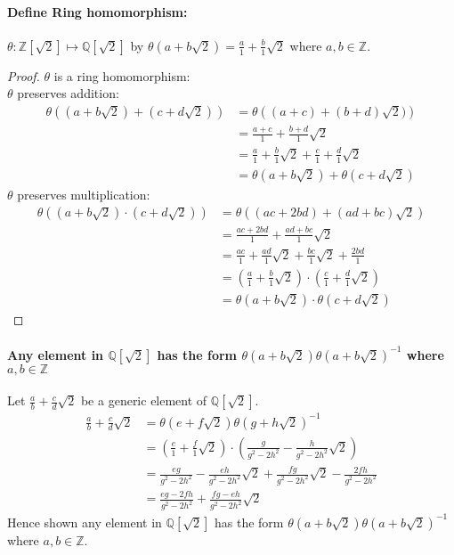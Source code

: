 \documentclass[12pt]{article}
\begin{document}
\begin{enumerate}
\begin{enumerate}
			\paragraph{Define Ring homomorphism:} $\theta: \mathbb{Z}[\sqrt{2}]
			\mapsto \mathbb{Q}[\sqrt{2}]$ by $\theta (a+b\sqrt{2}) =
			\frac{a}{1}+\frac{b}{1}\sqrt{2}$ where $a,b \in \mathbb{Z}$.
			\begin{proof} $\theta$ is a ring homomorphism:\\
				$\theta$ preserves addition:
				\begin{align*}
					\theta \left((a+b\sqrt{2}) + (c+d\sqrt{2})\right) &= \theta
						\left((a+c) + (b+d)\sqrt{2})\right)\\
					&= \frac{a+c}{1} + \frac{b+d}{1}\sqrt{2}\\
					&= \frac{a}{1} + \frac{b}{1}\sqrt{2} + \frac{c}{1} +
						\frac{d}{1}\sqrt{2}\\
					&= \theta (a+b\sqrt{2}) + \theta(c+d\sqrt{2})
				\end{align*}
				$\theta$ preserves multiplication:
				\begin{align*}
					\theta \left((a+b\sqrt{2}) \cdot (c+d\sqrt{2})\right) &= \theta
					((ac+2bd) + (ad + bc)\sqrt{2})\\
					&= \frac{ac+2bd}{1} + \frac{ad + bc}{1}\sqrt{2} \\
					&= \frac{ac}{1} + \frac{ad}{1}\sqrt{2} + \frac{bc}{1}\sqrt{2} +
						\frac{2bd}{1}\\
					&= (\frac{a}{1} + \frac{b}{1}\sqrt{2}) \cdot (\frac{c}{1} +
						\frac{d}{1}\sqrt{2})\\
					&= \theta (a+b\sqrt{2}) \cdot \theta(c+d\sqrt{2})
				\end{align*}
			\end{proof}
			\paragraph{Any element in $\mathbb{Q}[\sqrt{2}]$ has the form
			$\theta(a + b\sqrt{2})\theta(a + b\sqrt{2})^{-1}$ where $a,b \in
			\mathbb{Z}$} Let $\frac{a}{b}+\frac{c}{d}\sqrt{2}$ be a generic element of
			$\mathbb{Q}[\sqrt{2}]$.
				\begin{align*}
					\frac{a}{b}+\frac{c}{d}\sqrt{2} &= \theta(e +
					f\sqrt{2})\theta(g+h\sqrt{2})^{-1}\\
					&= (\frac{e}{1}+\frac{f}{1}\sqrt{2})
						\cdot (\frac{g}{g^2 - 2h^2} - \frac{h}{g^2 - 2h^2}\sqrt{2})\\
					&= \frac{eg}{g^2 - 2h^2} - \frac{eh}{g^2 - 2h^2}\sqrt{2} +
					\frac{fg}{g^2 - 2h^2}\sqrt{2} - \frac{2fh}{g^2 - 2h^2}\\
					&= \frac{eg-2fh}{g^2 - 2h^2} + \frac{fg-eh}{g^2 - 2h^2}\sqrt{2}
				\end{align*}
				Hence shown any element in $\mathbb{Q}[\sqrt{2}]$ has the form
			$\theta(a + b\sqrt{2})\theta(a + b\sqrt{2})^{-1}$ where $a,b \in
			\mathbb{Z}$.
		\end{enumerate}


\end{enumerate}
\end{document}
